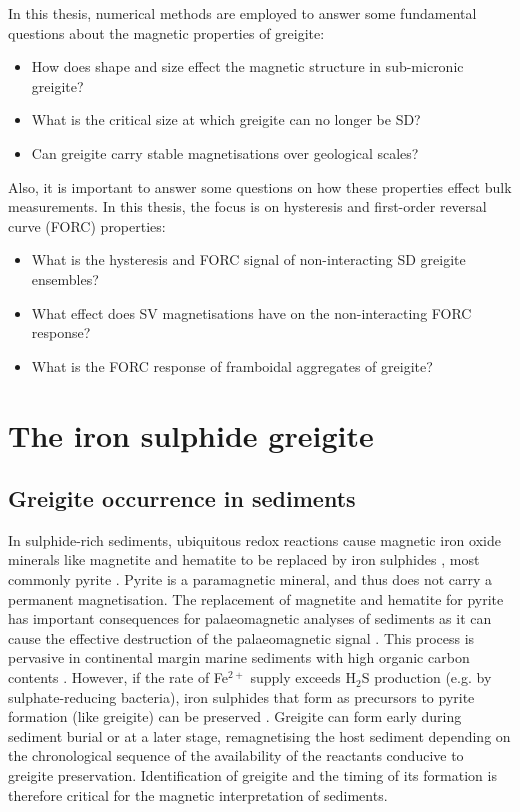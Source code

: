In this thesis, numerical methods are employed to answer some fundamental questions about the magnetic properties of greigite:
\begin{itemize}
\item How does shape and size effect the magnetic structure in sub-micronic greigite?
\item What is the critical size at which greigite can no longer be SD?
\item Can greigite carry stable magnetisations over geological scales?
\end{itemize}
Also, it is important to answer some questions on how these properties effect bulk measurements. In this thesis, the focus is on hysteresis \citep{Mayergoyz1986} and first-order reversal curve (FORC) \citep{Roberts2000} properties:
\begin{itemize}
\item What is the hysteresis and FORC signal of non-interacting SD greigite ensembles?
\item What effect does SV magnetisations have on the non-interacting FORC response?
\item What is the FORC response of framboidal aggregates of greigite?
\end{itemize}\par

\section{The iron sulphide greigite}
\subsection{Greigite occurrence in sediments}
In sulphide-rich sediments, ubiquitous redox reactions cause magnetic iron oxide minerals like magnetite and hematite to be replaced by iron sulphides \citep{Roberts2015}, most commonly pyrite \citep{Berner1984}. Pyrite is a paramagnetic mineral, and thus does not carry a permanent magnetisation. The replacement of magnetite and hematite for pyrite has important consequences for palaeomagnetic analyses of sediments as it can cause the effective destruction of the palaeomagnetic signal \citep{Rowan2009}. This process is pervasive in continental margin marine sediments with high organic carbon contents \citep{Roberts2015}. However, if the rate of Fe$^{2{+}}$ supply exceeds H$_2$S production (e.g. by sulphate-reducing bacteria), iron sulphides that form as precursors to pyrite formation (like greigite) can be preserved \citep{Berner1984}. Greigite can form early during sediment burial \citep{Reynolds1999} or at a later stage, remagnetising the host sediment \citep{Roberts2005} depending on the chronological sequence of the availability of the reactants conducive to greigite preservation. Identification of greigite and the timing of its formation is therefore critical for the magnetic interpretation of sediments.\par

